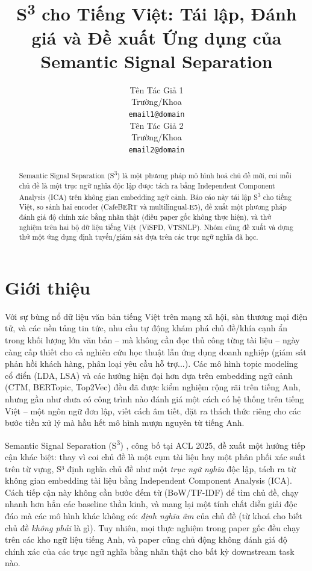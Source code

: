 \documentclass[11pt]{article}
\title{S\textsuperscript{3} cho Tiếng Việt: Tái lập, Đánh giá và Đề xuất Ứng dụng của Semantic Signal Separation}
\author{
  Tên Tác Giả 1 \\
  Trường/Khoa \\
  \texttt{email1@domain} \\\And
  Tên Tác Giả 2 \\
  Trường/Khoa \\
  \texttt{email2@domain}
}
\begin{document}
\maketitle

\begin{abstract}
Semantic Signal Separation (S\textsuperscript{3}) là một phương pháp mô hình
hoá chủ đề mới, coi mỗi chủ đề là một trục ngữ nghĩa độc lập được tách ra
bằng Independent Component Analysis (ICA) trên không gian embedding ngữ
cảnh. Báo cáo này tái lập S\textsuperscript{3} cho tiếng Việt, so sánh hai
encoder (CafeBERT và multilingual-E5), đề xuất một phương pháp đánh giá độ
chính xác bằng nhãn thật (điều paper gốc không thực hiện), và thử nghiệm
trên hai bộ dữ liệu tiếng Việt (ViSFD, VTSNLP). Nhóm cũng đề xuất và dựng
thử một ứng dụng định tuyến/giám sát dựa trên các trục ngữ nghĩa đã học.
\end{abstract}

\section{Giới thiệu}
\label{sec:intro}

Với sự bùng nổ dữ liệu văn bản tiếng Việt trên mạng xã hội, sàn thương mại
điện tử, và các nền tảng tin tức, nhu cầu tự động khám phá chủ đề/khía
cạnh ẩn trong khối lượng lớn văn bản -- mà không cần đọc thủ công từng tài
liệu -- ngày càng cấp thiết cho cả nghiên cứu học thuật lẫn ứng dụng doanh
nghiệp (giám sát phản hồi khách hàng, phân loại yêu cầu hỗ trợ...). Các mô
hình topic modeling cổ điển (LDA, LSA) và các hướng hiện đại hơn dựa trên
embedding ngữ cảnh (CTM, BERTopic, Top2Vec) đều đã được kiểm nghiệm rộng
rãi trên tiếng Anh, nhưng gần như chưa có công trình nào đánh giá một cách
có hệ thống trên tiếng Việt -- một ngôn ngữ đơn lập, viết cách âm tiết, đặt
ra thách thức riêng cho các bước tiền xử lý mà hầu hết mô hình mượn nguyên
từ tiếng Anh.

Semantic Signal Separation (S\textsuperscript{3}) \citep{kardos2025s3},
công bố tại ACL 2025, đề xuất một hướng tiếp cận khác biệt: thay vì coi
chủ đề là một cụm tài liệu hay một phân phối xác suất trên từ vựng, S³
định nghĩa chủ đề như một \emph{trục ngữ nghĩa} độc lập, tách ra từ không
gian embedding tài liệu bằng Independent Component Analysis (ICA). Cách
tiếp cận này không cần bước đếm từ (BoW/TF-IDF) để tìm chủ đề, chạy nhanh
hơn hẳn các baseline thần kinh, và mang lại một tính chất diễn giải độc
đáo mà các mô hình khác không có: \emph{định nghĩa âm} của chủ đề (từ khoá
cho biết chủ đề \emph{không phải} là gì). Tuy nhiên, mọi thực nghiệm trong
paper gốc đều chạy trên các kho ngữ liệu tiếng Anh, và paper cũng chủ động
không đánh giá độ chính xác của các trục ngữ nghĩa bằng nhãn thật cho bất
kỳ downstream task nào.
\end{document}
